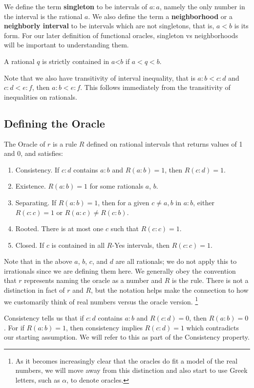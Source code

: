 \documentclass[12pt]{article}
\theoremstyle{remark}
\newcommand{\lt}{\mathord{<}}
\begin{document}
We define the term \textbf{singleton} to be intervals of $a:a$, namely the only number in the interval is the rational $a$. We also define the term a \textbf{neighborhood} or a \textbf{neighborly interval} to be intervals which are not singletons, that is, $a < b$ is its form. For our later definition of functional oracles, singleton vs neighborhoods will be important to understanding them. 

A rational $q$ is strictly contained in $a\lt b$ if $a < q < b$. 

Note that we also have transitivity of interval inequality, that is $a:b < c:d$ and $c:d < e:f$, then $a:b < e:f$. This follows immediately from the transitivity of inequalities on rationals.

\subsection{Defining the Oracle}

The Oracle of $r$ is a rule $R$ defined on rational intervals that returns values of 1 and 0, and satisfies: 
\begin{enumerate}
    \item Consistency. If $c:d$ contains $a:b$ and $R(a:b) = 1$, then $R(c:d) = 1$.
    \item Existence. $R(a:b) = 1$ for some rationals $a$, $b$.
    \item Separating. If $R(a:b)=1$, then for a given $c \neq a, b$ in $a:b$, either $R(c:c) = 1$ or $R(a:c) \neq R(c:b)$. 
    \item Rooted. There is at most one $c$ such that $R(c:c) =1$.
    \item Closed. If $c$ is contained in all $R$-Yes intervals, then $R(c:c) = 1$.
\end{enumerate}

Note that in the above $a$, $b$, $c$, and $d$ are all rationals; we do not apply this to irrationals since we are defining them here. We generally obey the convention that $r$ represents naming the oracle as a number and $R$ is the rule. There is not a distinction in fact of $r$ and $R$, but the notation helps make the connection to how we customarily think of real numbers versus the oracle version. \footnote{As it becomes increasingly clear that the oracles do fit a model of the real numbers, we will move away from this distinction and also start to use Greek letters, such as $\alpha$, to denote oracles.}

Consistency tells us that if $c:d$ contains $a:b$ and $R(c:d) = 0$, then $R(a:b) = 0$. For if $R(a:b)=1$, then consistency implies $R(c:d)=1$ which contradicts our starting assumption. We will refer to this as part of the Consistency property. 
\end{document}
